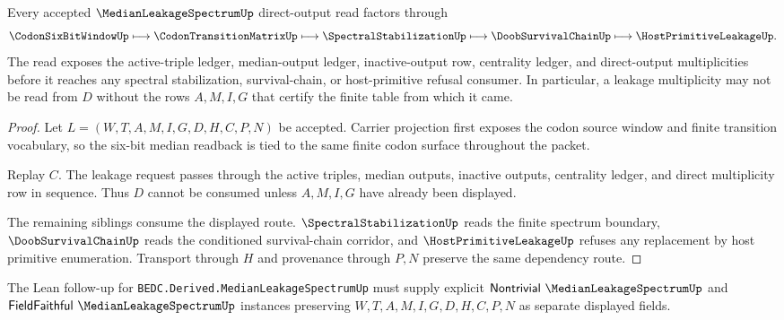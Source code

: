 \begin{theorem}\label{thm:median-leakage-spectrum-direct-output-route}
Every accepted $\MedianLeakageSpectrumUp$ direct-output read factors through
$$
\CodonSixBitWindowUp \longmapsto \CodonTransitionMatrixUp \longmapsto \SpectralStabilizationUp \longmapsto \DoobSurvivalChainUp \longmapsto \HostPrimitiveLeakageUp .
$$
The read exposes the active-triple ledger, median-output ledger, inactive-output row, centrality ledger, and direct-output multiplicities before it reaches any spectral stabilization, survival-chain, or host-primitive refusal consumer. In particular, a leakage multiplicity may not be read from $D$ without the rows $A,M,I,G$ that certify the finite table from which it came.
\end{theorem}
\begin{proof}
Let $L=(W,T,A,M,I,G,D,H,C,P,N)$ be accepted. Carrier projection first exposes the codon source window and finite transition vocabulary, so the six-bit median readback is tied to the same finite codon surface throughout the packet.

Replay $C$. The leakage request passes through the active triples, median outputs, inactive outputs, centrality ledger, and direct multiplicity row in sequence. Thus $D$ cannot be consumed unless $A,M,I,G$ have already been displayed.

The remaining siblings consume the displayed route. $\SpectralStabilizationUp$ reads the finite spectrum boundary, $\DoobSurvivalChainUp$ reads the conditioned survival-chain corridor, and $\HostPrimitiveLeakageUp$ refuses any replacement by host primitive enumeration. Transport through $H$ and provenance through $P,N$ preserve the same dependency route.
\end{proof}



The Lean follow-up for \texttt{BEDC.Derived.MedianLeakageSpectrumUp} must supply explicit $\mathsf{Nontrivial}\ \MedianLeakageSpectrumUp$ and $\mathsf{FieldFaithful}\ \MedianLeakageSpectrumUp$ instances preserving $W,T,A,M,I,G,D,H,C,P,N$ as separate displayed fields.

